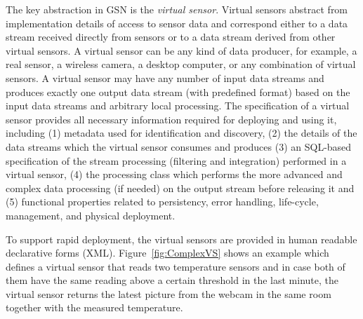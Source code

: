 The key abstraction in GSN is the \textit{virtual sensor}. Virtual
sensors abstract from implementation details of access to sensor data
and correspond either to a data stream received directly from sensors
or to a data stream derived from other virtual sensors. A virtual
sensor can be any kind of data producer, for example, a real sensor, a
wireless camera, a desktop computer, or any combination of virtual sensors.
A virtual sensor may have any number of input data
streams and produces exactly one output data stream (with predefined format) based on the input
data streams and arbitrary local processing. The specification of a
virtual sensor provides all necessary information required for
deploying and using it, including (1) metadata used for identification
and discovery, (2) the details of the data streams which the virtual
sensor consumes and produces (3) an SQL-based specification of the
stream processing (filtering and integration) performed in a virtual sensor, (4)
the processing class which performs the more advanced and complex data processing (if needed) on the output
stream before releasing it and (5) functional properties related to persistency, error handling, life-cycle,
management, and physical deployment.

To support rapid deployment, the virtual sensors are provided
in human readable declarative forms (XML). Figure~\ref{fig:ComplexVS} shows an
example which defines a virtual sensor that reads two temperature sensors and
in case both of them have the same reading above a certain threshold in the
last minute, the virtual sensor returns the latest picture from the webcam in
the same room together with the measured temperature.


